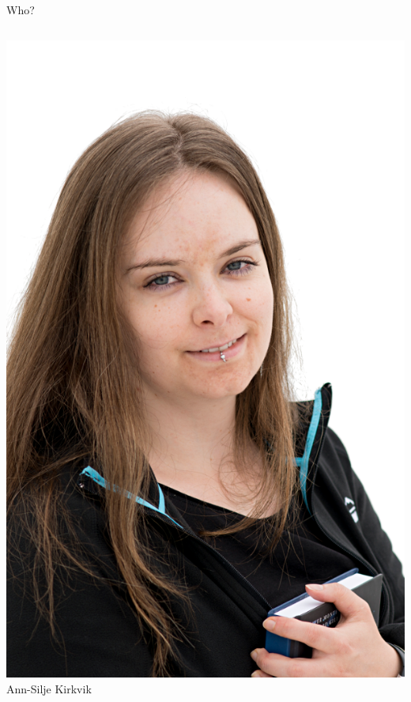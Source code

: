 \documentclass[ignorenonframetext,12pt,t]{beamer}
\begin{document}
\begin{frame}{Who?}
\begin{columns}[c]
    \begin{center}
      \includegraphics[width=\linewidth]{figure/annsilje} \\
      \small{Ann-Silje Kirkvik}
    \end{center}
  \end{columns}
\end{frame}
\end{document}
